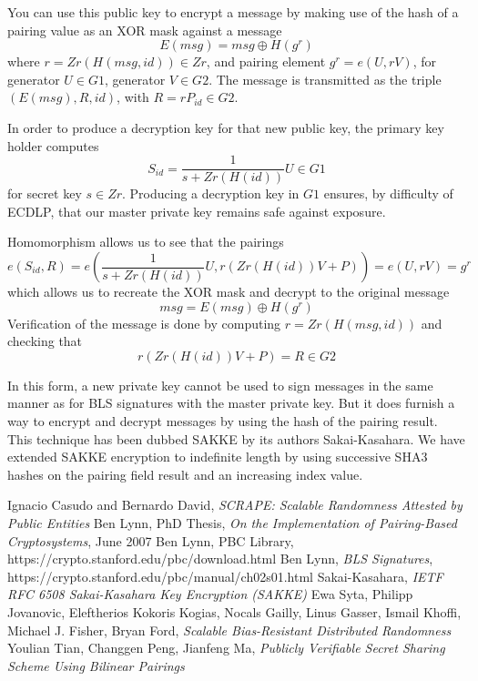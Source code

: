 \documentclass[article,oneside]{memoir}
\begin{document}
You can use this public key to encrypt a message by making use of the hash of a pairing value as an XOR mask against a message $$E(msg) = msg \oplus H(g^r)$$ where $r = Zr(H(msg, id)) \in Zr$, and pairing element $g^r = e(U, r V)$, for generator $U \in G1$, generator $V \in G2$. The message is transmitted as the triple $(E(msg), R, id)$, with $R = r P_{id} \in G2$.

In order to produce a decryption key for that new public key, the primary key holder computes $$S_{id} = \frac{1}{s + Zr(H(id))} U \in G1$$ for secret key $s \in Zr$. Producing a decryption key in $G1$ ensures, by difficulty of ECDLP, that our master private key remains safe against exposure.

Homomorphism allows us to see that the pairings 
$$e(S_{id}, R) = e(\frac{1}{s + Zr(H(id))} U, r(Zr(H(id)) V + P)) = e(U, r V) = g^r$$ which allows us to recreate the XOR mask and decrypt to the original message $$msg = E(msg) \oplus H(g^r)$$ Verification of the message is done by computing $r = Zr(H(msg, id))$ and checking that $$r (Zr(H(id)) V + P) = R \in G2$$

In this form, a new private key cannot be used to sign messages in the same manner as for BLS signatures with the master private key. But it does furnish a way to encrypt and decrypt messages by using the hash of the pairing result. This technique has been dubbed SAKKE by its authors Sakai-Kasahara\cite{sakke}. We have extended SAKKE encryption to indefinite length by using successive SHA3 hashes on the pairing field result and an increasing index value.

\begin{thebibliography}{99}

Ignacio Casudo and Bernardo David, {\em{ SCRAPE: Scalable Randomness Attested by Public Entities}} 
 Ben Lynn, PhD Thesis, {\em{On the Implementation of Pairing-Based Cryptosystems}}, June 2007
 Ben Lynn, PBC Library, https://crypto.stanford.edu/pbc/download.html
 Ben Lynn, {\em{BLS Signatures}}, https://crypto.stanford.edu/pbc/manual/ch02s01.html
Sakai-Kasahara, {\em{IETF RFC 6508 Sakai-Kasahara Key Encryption (SAKKE)}} 
 Ewa Syta, Philipp Jovanovic, Eleftherios Kokoris Kogias, Nocals Gailly, Linus Gasser, Ismail Khoffi, Michael J. Fisher, Bryan Ford, {\em{Scalable Bias-Resistant Distributed Randomness}}
 Youlian Tian, Changgen Peng, Jianfeng Ma, {\em{Publicly Verifiable Secret Sharing Scheme Using Bilinear Pairings}} 
\end{thebibliography} 
\end{document}

